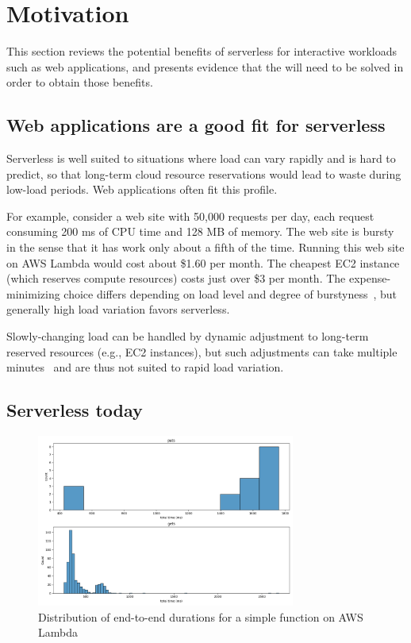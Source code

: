 \section{Motivation}\label{s:motivation}

This section reviews the potential benefits of serverless for
interactive workloads such as web applications, and presents
evidence that the {\problem} will need to be solved in order to
obtain those benefits.

\subsection{Web applications are a good fit for serverless}

Serverless is well suited to situations where load can vary rapidly
and is hard to predict, so that long-term cloud resource reservations
would lead to waste during low-load periods. Web applications often
fit this profile.

For example, consider a web site with 50,000 requests per day, each
request consuming 200 ms of CPU time and 128 MB of memory. The web
site is bursty in the sense that it has work only about a fifth of the
time. Running this web site on AWS Lambda would cost about \$1.60 per
month. The cheapest EC2 instance (which reserves compute resources)
costs just over \$3 per month. The expense-minimizing choice differs
depending on load level and degree of
burstyness~\cite{econ-of-serverless,trek10-blog},
but generally high load variation favors serverless.

Slowly-changing load can be handled by dynamic adjustment to long-term
reserved resources (e.g., EC2 instances), but such adjustments can take
multiple minutes~\cite{ec2-autoscaling} and are thus not suited to
rapid load variation.

\subsection{Serverless today}

\begin{figure}[t!]
  \centering
    \includegraphics[width=8.5cm]{img/aws_webapp_times.png}
    \caption{Distribution of end-to-end durations for a simple function on AWS Lambda }
  \label{fig:lambda-total-durations}
\end{figure}


